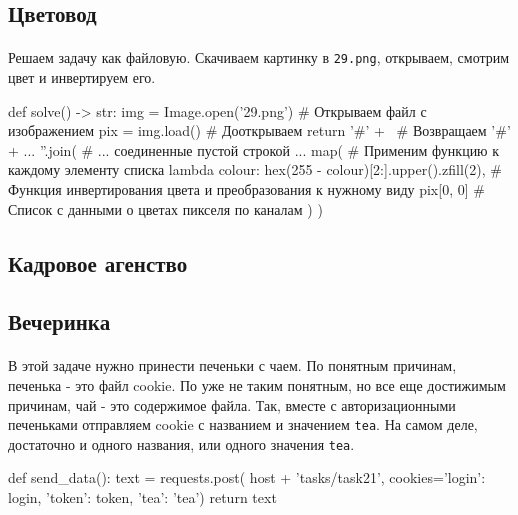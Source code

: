 \documentclass[12pt]{article}
\begin{document}

    \subsection{Цветовод}
    \paragraph{}
    Решаем задачу как файловую.
    Скачиваем картинку в \verb|29.png|, открываем, смотрим цвет и инвертируем его.
    \begin{pythoncode}
def solve() -> str:
    img = Image.open('29.png')   # Открываем файл с изображением
    pix = img.load()             # Дооткрываем
    return '#' + \               # Возвращаем '#' + ...
           ''.join(              # ... соединенные пустой строкой ...
               map(              # Применим функцию к каждому элементу списка
                   lambda colour: hex(255 - colour)[2:].upper().zfill(2),
                                 # Функция инвертирования цвета и преобразования к нужному виду
                   pix[0, 0]     # Список с данными о цветах пикселя по каналам
               )
           )
    \end{pythoncode}


    \subsection{Кадровое агенство}


    \subsection{Вечеринка}
    \paragraph{}
    В этой задаче нужно принести печеньки с чаем.
    По понятным причинам, печенька - это файл cookie.
    По уже не таким понятным, но все еще достижимым причинам, чай - это содержимое файла.
    Так, вместе с авторизационными печеньками отправляем cookie с названием и значением \verb|tea|.
    На самом деле, достаточно и одного названия, или одного значения \verb|tea|.
    \begin{pythoncode}
def send_data():
    text = requests.post(
        host + 'tasks/task21',
        cookies={'login': login, 'token': token, 'tea': 'tea'})
    return text
    \end{pythoncode}
\end{document}
